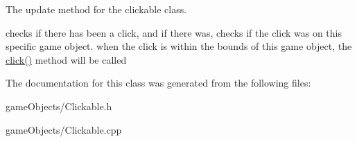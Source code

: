 The update method for the clickable class. 

checks if there has been a click, and if there was, checks if the click was on this specific game object. when the click is within the bounds of this game object, the \hyperlink{class_clickable_a1f99a456a892196f3fa9b6e380e7ac7a}{click()} method will be called 

The documentation for this class was generated from the following files\+:\begin{DoxyCompactItemize}
\item 
game\+Objects/Clickable.\+h\item 
game\+Objects/Clickable.\+cpp\end{DoxyCompactItemize}
